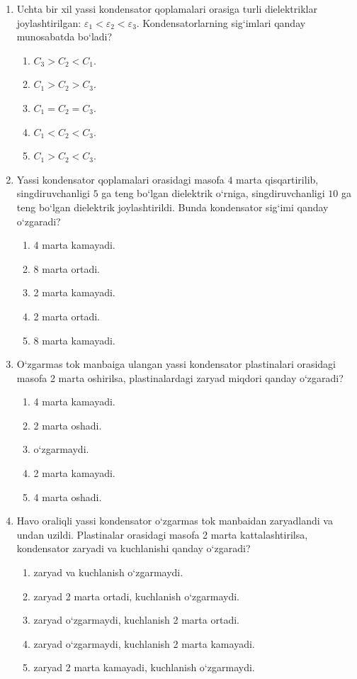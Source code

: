 \begin{enumerate}
\item Uchta bir xil yassi kondensator qoplamalari orasiga turli dielektriklar joylashtirilgan: $\varepsilon_1<\varepsilon_2<\varepsilon_3$. Kondensatorlarning sig‘imlari qanday munosabatda bo‘ladi?
\begin{enumerate}[label=\Alph*)]
\item $C_3>C_2<C_1$.
\item $C_1>C_2>C_3$.
\item $C_1=C_2=C_3$.
\item $C_1<C_2<C_3$.
\item $C_1>C_2<C_3$.
\end{enumerate}

\item Yassi kondensator qoplamalari orasidagi masofa $4$ marta qisqartirilib, singdiruvchanligi $5$ ga teng bo‘lgan dielektrik o‘rniga, singdiruvchanligi $10$ ga teng bo‘lgan dielektrik joylashtirildi. Bunda kondensator sig‘imi qanday o‘zgaradi?
\begin{enumerate}[label=\Alph*)]
\item 4 marta kamayadi.
\item 8 marta ortadi.
\item 2 marta kamayadi.
\item 2 marta ortadi.
\item 8 marta kamayadi.
\end{enumerate}

\item O‘zgarmas tok manbaiga ulangan yassi kondensator plastinalari orasidagi masofa 2 marta oshirilsa, plastinalardagi zaryad miqdori qanday o‘zgaradi?
\begin{enumerate}[label=\Alph*)]
\item 4 marta kamayadi.
\item 2 marta oshadi.
\item o‘zgarmaydi.
\item 2 marta kamayadi.
\item 4 marta oshadi.
\end{enumerate}

\item Havo oraliqli yassi kondensator o‘zgarmas tok manbaidan zaryadlandi va undan uzildi. Plastinalar orasidagi masofa 2 marta kattalashtirilsa, kondensator zaryadi va kuchlanishi qanday o‘zgaradi?
\begin{enumerate}[label=\Alph*)]
\item zaryad va kuchlanish o‘zgarmaydi.
\item zaryad 2 marta ortadi, kuchlanish o‘zgarmaydi.
\item zaryad o‘zgarmaydi, kuchlanish 2 marta ortadi.
\item zaryad o‘zgarmaydi, kuchlanish 2 marta kamayadi.
\item zaryad 2 marta kamayadi, kuchlanish o‘zgarmaydi.
\end{enumerate}


\end{enumerate}
